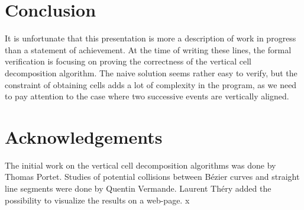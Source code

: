 \documentclass{easychair}
\begin{document}
\section{Conclusion}
It is unfortunate that this presentation is more a description of work
in progress than a statement of achievement.  At the time of writing
these lines, the formal verification
is focusing on proving the correctness of the vertical cell
decomposition algorithm.  The naive solution seems rather easy to
verify, but the constraint of obtaining cells adds a lot of complexity
in the program, as we need to pay attention to the case where two
successive events are vertically aligned.

\section*{Acknowledgements}
The initial work on the vertical cell decomposition algorithms was
done by Thomas Portet.  Studies of potential collisions between Bézier
curves and straight line segments were done by Quentin Vermande.
Laurent Théry added the possibility to visualize the results on a
web-page.
x


\end{document}
